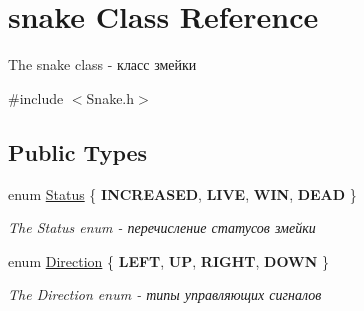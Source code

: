 \hypertarget{classsnake}{}\section{snake Class Reference}
\label{classsnake}


The snake class -\/ класс змейки  




{\ttfamily \#include $<$Snake.\+h$>$}

\subsection*{Public Types}
\begin{DoxyCompactItemize}
\item 
\hypertarget{classsnake_a490fdfa738dec404d2fea835645d66c2}{}enum \hyperlink{classsnake_a490fdfa738dec404d2fea835645d66c2}{Status} \{ {\bfseries I\+N\+C\+R\+E\+A\+S\+E\+D}, 
{\bfseries L\+I\+V\+E}, 
{\bfseries W\+I\+N}, 
{\bfseries D\+E\+A\+D}
 \}\label{classsnake_a490fdfa738dec404d2fea835645d66c2}

\begin{DoxyCompactList}\small\item\em The Status enum -\/ перечисление статусов змейки \end{DoxyCompactList}\item 
\hypertarget{classsnake_adbd63ec22af655a4827ae26c7b9f5216}{}enum \hyperlink{classsnake_adbd63ec22af655a4827ae26c7b9f5216}{Direction} \{ {\bfseries L\+E\+F\+T}, 
{\bfseries U\+P}, 
{\bfseries R\+I\+G\+H\+T}, 
{\bfseries D\+O\+W\+N}
 \}\label{classsnake_adbd63ec22af655a4827ae26c7b9f5216}

\begin{DoxyCompactList}\small\item\em The Direction enum -\/ типы управляющих сигналов \end{DoxyCompactList}\end{DoxyCompactItemize}

